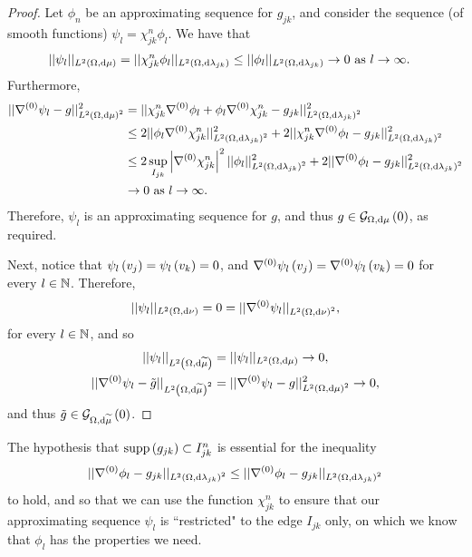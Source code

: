 \begin{proof}
	Let $\phi_n$ be an approximating sequence for $g_{jk}$, and consider the sequence (of smooth functions) $\psi_l = \chi_{jk}^n\phi_l$.
	We have that
	\begin{align*}
		\lvert\lvert \psi_l \rvert\rvert_{L^{2}\left( \Omega,\mathrm{d} \mu \right)} 
		&= \lvert\lvert \chi_{jk}^n\phi_l \rvert\rvert_{L^{2}\left( \Omega,\mathrm{d} \lambda_{jk} \right)}
		\leq \lvert\lvert \phi_l \rvert\rvert_{L^{2}\left( \Omega,\mathrm{d} \lambda_{jk} \right)} \rightarrow 0 \ \text{as} \ l \rightarrow\infty.
	\end{align*}
	Furthermore,
	\begin{align*}
		\lvert\lvert \nabla^{(0)}\psi_l - g \rvert\rvert_{L^{2}\left( \Omega,\mathrm{d} \mu \right)^2}^2
		&= \lvert\lvert \chi_{jk}^n\nabla^{(0)}\phi_l + \phi_l\nabla^{(0)}\chi_{jk}^n - g_{jk} \rvert\rvert_{L^{2}\left( \Omega,\mathrm{d} \lambda_{jk} \right)^2}^2 \\
		&\leq 2\lvert\lvert \phi_l\nabla^{(0)}\chi_{jk}^n \rvert\rvert_{L^{2}\left( \Omega,\mathrm{d} \lambda_{jk} \right)^2}^2 + 2\lvert\lvert \chi_{jk}^n\nabla^{(0)}\phi_l - g_{jk} \rvert\rvert_{L^{2}\left( \Omega,\mathrm{d} \lambda_{jk} \right)^2}^2 \\
		&\leq 2\sup_{I_{jk}}\left\lvert \nabla^{(0)}\chi_{jk}^n \right\rvert^2 \lvert\lvert \phi_l \rvert\rvert_{L^{2}\left( \Omega,\mathrm{d} \lambda_{jk} \right)^2}^2
		+ 2\lvert\lvert \nabla^{(0)}\phi_l - g_{jk} \rvert\rvert_{L^{2}\left( \Omega,\mathrm{d} \lambda_{jk} \right)^2}^2 \\
		&\rightarrow 0 \ \text{as} \ l \rightarrow\infty.
	\end{align*}
	Therefore, $\psi_l$ is an approximating sequence for $g$, and thus $g\in\mathcal{G}_{ \Omega, \mathrm{d}\mu}\left( 0 \right)$, as required.
	
	Next, notice that $\psi_l\left( v_j \right) = \psi_l\left( v_k \right) = 0$, and $\nabla^{(0)}\psi_l\left( v_j \right) = \nabla^{(0)}\psi_l\left( v_k \right) = 0$ for every $l\in\mathbb{N}$.
	Therefore,
	\begin{align*}
		\lvert\lvert \psi_l \rvert\rvert_{L^{2}\left( \Omega,\mathrm{d} \nu \right)} = 0 = \lvert\lvert \nabla^{(0)}\psi_l \rvert\rvert_{L^{2}\left( \Omega,\mathrm{d} \nu \right)^2},
	\end{align*}
	for every $l\in\mathbb{N}$, and so
	\begin{align*}
		\lvert\lvert \psi_l \rvert\rvert_{L^{2}\left( \Omega,\mathrm{d} \widetilde{\mu} \right)} &= \lvert\lvert \psi_l \rvert\rvert_{L^{2}\left( \Omega,\mathrm{d} \mu \right)} \rightarrow 0, \\
		\lvert\lvert \nabla^{(0)}\psi_l - \tilde{g} \rvert\rvert_{L^{2}\left( \Omega,\mathrm{d} \widetilde{\mu} \right)^2} &= \lvert\lvert \nabla^{(0)}\psi_l - g \rvert\rvert_{L^{2}\left( \Omega,\mathrm{d} \mu \right)^2}^2 \rightarrow 0,
	\end{align*}
	and thus $\tilde{g}\in\mathcal{G}_{ \Omega, \mathrm{d}\widetilde{\mu}}\left( 0 \right)$.
\end{proof}
The hypothesis that $\mathrm{supp}\left( g_{jk} \right)\subset I_{jk}^n$ is essential for the inequality 
\begin{align*}
	\lvert\lvert \nabla^{(0)}\phi_l - g_{jk} \rvert\rvert_{L^{2}\left( \Omega,\mathrm{d} \lambda_{jk} \right)^2} \leq \lvert\lvert \nabla^{(0)}\phi_l - g_{jk} \rvert\rvert_{L^{2}\left( \Omega,\mathrm{d} \lambda_{jk} \right)^2}
\end{align*} 
to hold, and so that we can use the function $\chi_{jk}^n$ to ensure that our approximating sequence $\psi_l$ is ``restricted" to the edge $I_{jk}$ only, on which we know that $\phi_l$ has the properties we need.

